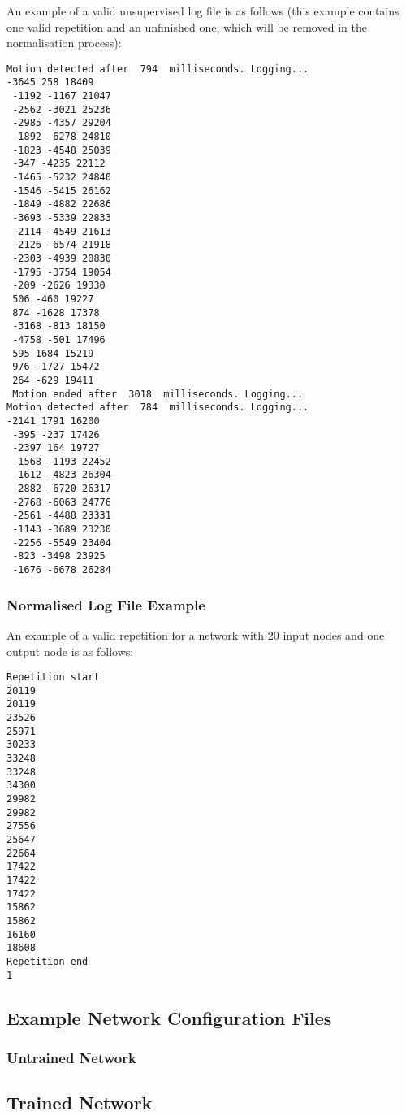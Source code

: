 \documentclass[a4paper]{article}
\begin{document}
An example of a valid unsupervised log file is as follows (this example contains one valid repetition and an unfinished one, which will be removed in the normalisation process):

\begin{lstlisting}
Motion detected after  794  milliseconds. Logging...
-3645 258 18409
 -1192 -1167 21047
 -2562 -3021 25236
 -2985 -4357 29204
 -1892 -6278 24810
 -1823 -4548 25039
 -347 -4235 22112
 -1465 -5232 24840
 -1546 -5415 26162
 -1849 -4882 22686
 -3693 -5339 22833
 -2114 -4549 21613
 -2126 -6574 21918
 -2303 -4939 20830
 -1795 -3754 19054
 -209 -2626 19330
 506 -460 19227
 874 -1628 17378
 -3168 -813 18150
 -4758 -501 17496
 595 1684 15219
 976 -1727 15472
 264 -629 19411
 Motion ended after  3018  milliseconds. Logging...
Motion detected after  784  milliseconds. Logging...
-2141 1791 16200
 -395 -237 17426
 -2397 164 19727
 -1568 -1193 22452
 -1612 -4823 26304
 -2882 -6720 26317
 -2768 -6063 24776
 -2561 -4488 23331
 -1143 -3689 23230
 -2256 -5549 23404
 -823 -3498 23925
 -1676 -6678 26284
\end{lstlisting}

\subsubsection{Normalised Log File Example}

An example of a valid repetition for a network with 20 input nodes and one output node is as follows:

\begin{lstlisting}
Repetition start
20119
20119
23526
25971
30233
33248
33248
34300
29982
29982
27556
25647
22664
17422
17422
17422
15862
15862
16160
18608
Repetition end
1
\end{lstlisting}

\subsection{Example Network Configuration Files}%

\subsubsection{Untrained Network}


\subsection{Trained Network}
\end{document}
